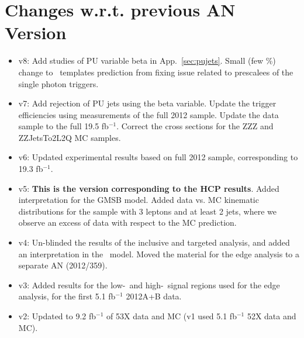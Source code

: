 \section{Changes w.r.t. previous AN Version}
\label{sec:changes}

\begin{itemize}

\item v8: Add studies of PU variable beta in App.~\ref{sec:pujets}. Small (few \%) change to \MET\ templates prediction from fixing issue related to prescalees of the single photon triggers.
\item v7: Add rejection of PU jets using the beta variable. Update the trigger efficiencies using measurements of the full 2012 sample. Update the data sample to the full 19.5 fb$^{-1}$. Correct the cross sections for the ZZZ and ZZJetsTo2L2Q MC samples.
\item v6: Updated experimental results based on full 2012 sample, corresponding to 19.3 fb$^{-1}$.
\item v5: {\bf This is the version corresponding to the HCP results}. Added interpretation for the GMSB model. %
Added data vs. MC kinematic distributions for the sample with 3 leptons and at least 2 jets, where we observe an excess of data with respect to the MC prediction. %
\item v4: Un-blinded the results of the inclusive and targeted analysis, and added an interpretation in the \wzmet\ model. Moved the material for the edge analysis to a separate AN (2012/359).
\item v3: Added results for the low-\MET\ and high-\MET\ signal regions used for the edge analysis, for the first 5.1 fb$^{-1}$ 2012A+B data.
\item v2: Updated to 9.2 fb$^{-1}$ of 53X data and MC (v1 used 5.1 fb$^{-1}$ 52X data and MC).

\end{itemize}
